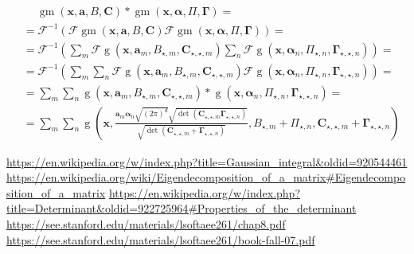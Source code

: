 \documentclass{paper}
\newcommand{\F}{\ensuremath{\mathcal{F}}}
\newcommand{\vr}[1]{\ensuremath{\boldsymbol{#1}}}
\newcommand{\tr}[1]{\ensuremath{\boldsymbol{#1}}}
\newcommand{\f}[1]{\operatorname{#1}}
\newcommand{\alphavec}[0]{\ensuremath{\vr{\alpha{}}}}
\newcommand{\avec}[0]{\ensuremath{\vr{a}}}
\newcommand{\xvec}[0]{\ensuremath{\vr{x}}}
\newcommand{\Ctns}[0]{\ensuremath{\tr{C}}}
\newcommand{\Gammatns}[0]{\ensuremath{\tr{\Gamma}}}
\begin{document}
\begin{align*}
	&\ \quad \f{gm}(\xvec, \avec, B, \Ctns) \ast \f{gm}(\xvec, \alphavec, \Pi, \Gammatns) = \\
	&= \F^{-1}\left(\F\f{gm}(\xvec, \avec, B, \Ctns) \F\f{gm}(\xvec, \alphavec, \Pi, \Gammatns)\right) = \\
	&= \F^{-1}\left(\sum_{m}\F\f{g}(\xvec, \avec_m, B_{\star, m}, \Ctns_{\star, \star, m}) \sum_n \F\f{g}(\xvec, \alphavec_n, \Pi_{\star, n}, \Gammatns_{\star, \star, n})\right) = \\
	&= \F^{-1}\left(\sum_{m}\sum_n  \F\f{g}(\xvec, \avec_m, B_{\star, m}, \Ctns_{\star, \star, m}) \F\f{g}(\xvec, \alphavec_n, \Pi_{\star, n}, \Gammatns_{\star, \star, n})\right) = \\
	&= \sum_{m}\sum_n \f{g}(\xvec, \avec_m, B_{\star, m}, \Ctns_{\star, \star, m}) \ast \f{g}(\xvec, \alphavec_n, \Pi_{\star, n}, \Gammatns_{\star, \star, n}) = \\
	&= \sum_{m}\sum_n \f{g}\left(\xvec, \frac{\avec_m \alphavec_n \sqrt{(2 \pi)^d} \sqrt{\f{det}(\Ctns_{\star, \star, m}\Gammatns_{\star, \star, n})}}{\sqrt{\f{det}(\Ctns_{\star, \star, m}+\Gammatns_{\star, \star, n})}}, B_{\star, m} + \Pi_{\star, n}, \Ctns_{\star, \star, m} + \Gammatns_{\star, \star, n}\right)
\end{align*}

\begin{thebibliography}{9}%
	 \url{https://en.wikipedia.org/w/index.php?title=Gaussian_integral&oldid=920544461}
	 \url{https://en.wikipedia.org/wiki/Eigendecomposition_of_a_matrix#Eigendecomposition_of_a_matrix}
	 \url{https://en.wikipedia.org/w/index.php?title=Determinant&oldid=922725964#Properties_of_the_determinant}
	 \url{https://see.stanford.edu/materials/lsoftaee261/chap8.pdf}
	 \url{https://see.stanford.edu/materials/lsoftaee261/book-fall-07.pdf}
\end{thebibliography}
\end{document}
